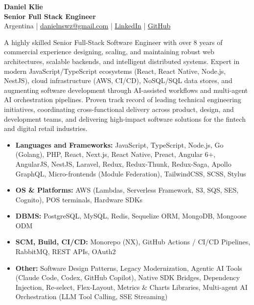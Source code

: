 \documentclass[10pt,a4paper]{article}
\makeatletter
\renewcommand\section{\@startsection{section}{1}{0pt}{12pt}{6pt}{\Large\bfseries\color{primary}}}
\makeatother
\begin{document}
\pagestyle{empty}

\begin{center}
    {\Huge \textbf{\color{primary} Daniel Klie}} \\[6pt]
    {\Large \textbf{\color{secondary} Senior Full Stack Engineer}} \\[6pt]
    \small 
    Argentina \quad | \quad 
    \href{mailto:danielnswz@gmail.com}{danielnswz@gmail.com} \quad | \quad 
    \href{https://www.linkedin.com/in/dklie}{LinkedIn} \quad | \quad 
    \href{https://github.com/danielnswz}{GitHub}
\end{center}

\vspace{8pt}

\section{Summary}
A highly skilled Senior Full-Stack Software Engineer with over 8 years of commercial experience designing, scaling, and maintaining robust web architectures, scalable backends, and intelligent distributed systems. Expert in modern JavaScript/TypeScript ecosystems (React, React Native, Node.js, NestJS), cloud infrastructure (AWS, CI/CD), NoSQL/SQL data stores, and augmenting software development through AI-assisted workflows and multi-agent AI orchestration pipelines. Proven track record of leading technical engineering initiatives, coordinating cross-functional delivery across product, design, and development teams, and delivering high-impact software solutions for the fintech and digital retail industries.

\section{Skills}
\begin{itemize}
    \item \textbf{Languages and Frameworks:} JavaScript, TypeScript, Node.js, Go (Golang), PHP, React, Next.js, React Native, Preact, Angular 6+, AngularJS, NestJS, Laravel, Redux, Redux-Thunk, Redux-Saga, Apollo GraphQL, Micro-frontends (Module Federation), TailwindCSS, SCSS, Stylus
    \item \textbf{OS \& Platforms:} AWS (Lambdas, Serverless Framework, S3, SQS, SES, Cognito), POS terminals, Hardware SDKs
    \item \textbf{DBMS:} PostgreSQL, MySQL, Redis, Sequelize ORM, MongoDB, Mongoose ODM
    \item \textbf{SCM, Build, CI/CD:} Monorepo (NX), GitHub Actions / CI/CD Pipelines, RabbitMQ, REST APIs, OAuth2
    \item \textbf{Other:} Software Design Patterns, Legacy Modernization, Agentic AI Tools (Claude Code, Codex, GitHub Copilot), Native SDK Bridges, Dependency Injection, Re-select, Flex-Layout, Metrics \& Charts Libraries, Multi-agent AI Orchestration (LLM Tool Calling, SSE Streaming)
\end{itemize}
\end{document}
